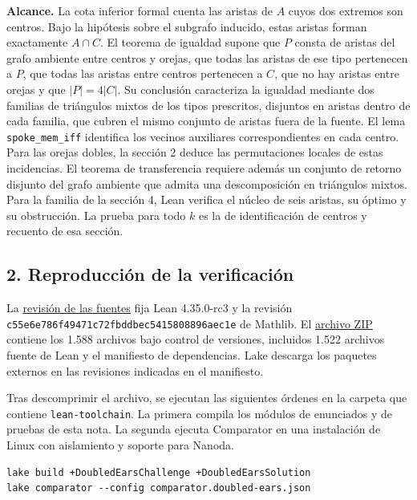 \documentclass[spanish,11pt,a4paper]{article}
\begin{document}
\textbf{Alcance.} La cota inferior formal cuenta las aristas de \(A\) cuyos dos extremos son centros. Bajo la hipótesis sobre el subgrafo inducido, estas aristas forman exactamente \(A\cap C\). El teorema de igualdad supone que \(P\) consta de aristas del grafo ambiente entre centros y orejas, que todas las aristas de ese tipo pertenecen a \(P\), que todas las aristas entre centros pertenecen a \(C\), que no hay aristas entre orejas y que \(|P|=4|C|\). Su conclusión caracteriza la igualdad mediante dos familias de triángulos mixtos de los tipos prescritos, disjuntos en aristas dentro de cada familia, que cubren el mismo conjunto de aristas fuera de la fuente. El lema \texttt{spoke\_mem\_iff} identifica los vecinos auxiliares correspondientes en cada centro. Para las orejas dobles, la sección 2 deduce las permutaciones locales de estas incidencias. El teorema de transferencia requiere además un conjunto de retorno disjunto del grafo ambiente que admita una descomposición en triángulos mixtos. Para la familia de la sección 4, Lean verifica el núcleo de seis aristas, su óptimo y su obstrucción. La prueba para todo \(k\) es la de identificación de centros y recuento de esa sección.

\clearpage\subsection{2. Reproducción de la verificación}\label{reproducciuxf3n-de-la-verificaciuxf3n}

La \href{https://github.com/jtraverso/typed-triangle-absorption/tree/c7bae66dfd66370138d2f1a6ecc51d3aa29ea8e4}{revisión de las fuentes} fija Lean 4.35.0-rc3 y la revisión \nolinkurl{c55e6e786f49471c72fbddbec5415808896aec1e} de Mathlib. El \href{https://github.com/jtraverso/nash-williams-triangle-decompositions-release/releases/download/doubled-ears-preprint-1.0-r3/Doubled_ears_LEAN_SOURCE_v1.0.zip}{archivo ZIP} contiene los 1.588 archivos bajo control de versiones, incluidos 1.522 archivos fuente de Lean y el manifiesto de dependencias. Lake descarga los paquetes externos en las revisiones indicadas en el manifiesto.

Tras descomprimir el archivo, se ejecutan las siguientes órdenes en la carpeta que contiene \texttt{lean-toolchain}. La primera compila los módulos de enunciados y de pruebas de esta nota. La segunda ejecuta Comparator en una instalación de Linux con aislamiento y soporte para Nanoda.

\begin{verbatim}
lake build +DoubledEarsChallenge +DoubledEarsSolution
lake comparator --config comparator.doubled-ears.json
\end{verbatim}
\end{document}
